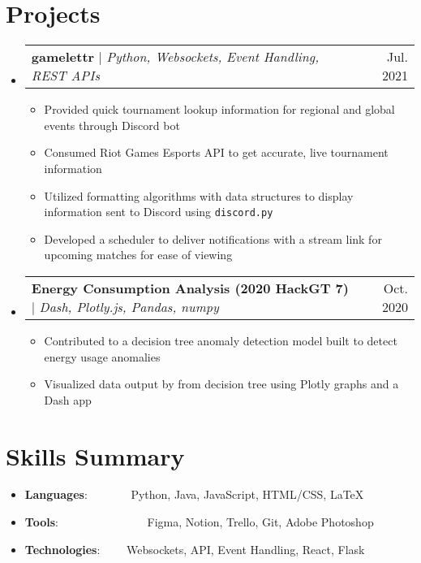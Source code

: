 \documentclass[a4paper,11pt]{extarticle}
\makeatletter
\newcommand{\resumeSkillItem}[2]{
	\item\small{
		\textbf{#1}{: #2 \vspace{-2pt}}
	}
}
\newcommand{\resumeItem}[1]{
	\item\small{
		#1 \vspace{-1pt}
	}
}
\newcommand{\resumeProjectHeading}[3]{
	\vspace{-3pt}\item
		\begin{tabular*}{1\linewidth}{l@{\extracolsep{\fill}}r}
			\textbf{#1} $|$ \emph{#2} & #3 \\
		\end{tabular*}\vspace{-3pt}
}
\newcommand{\resumeSubItem}[2]{\resumeSkillItem{#1}{#2}\vspace{-5pt}}
\newcommand{\resumeSubHeadingListStart}{\begin{itemize}[leftmargin=0.15in,label={}]}
\newcommand{\resumeSubHeadingListEnd}{\end{itemize}}
\newcommand{\resumeItemListStart}{\begin{itemize}\vspace{-3pt}}
\newcommand{\resumeItemListEnd}{\end{itemize}\vspace{-3pt}}
\makeatother
\begin{document}
\section{Projects}
    \resumeSubHeadingListStart
      \vspace{1mm}
      \resumeProjectHeading
          {gamelettr}
          {Python, Websockets, Event Handling, REST APIs}
          {Jul. 2021}
        \resumeItemListStart
            \resumeItem{Provided quick tournament lookup information for
                regional and global events through Discord bot}
            \resumeItem{Consumed Riot Games Esports API to get accurate, live
                tournament information}
            \resumeItem{Utilized formatting algorithms with data structures to
                display information sent to Discord using \texttt{discord.py}}
            \resumeItem{
                Developed a scheduler to deliver notifications with a stream link for upcoming matches for ease of viewing
            }
        \resumeItemListEnd
        \resumeProjectHeading
        {Energy Consumption Analysis (2020 HackGT 7)}
        {Dash, Plotly.js, Pandas, numpy}
        {Oct. 2020}
        \resumeItemListStart
            \resumeItem{
                Contributed to a decision tree anomaly detection model
                built to detect energy usage anomalies
            }
            \resumeItem{
                Visualized data output by from decision tree using Plotly
                graphs and a Dash app
            }
        \resumeItemListEnd
    \resumeSubHeadingListEnd

\section{Skills Summary}
	\resumeSubHeadingListStart
		\resumeSubItem{Languages}
			{\hspace{0.6mm}~~~~~~~Python, Java, JavaScript, HTML/CSS, \LaTeX}
		\resumeSubItem{Tools}
            {\hspace{0.3mm}~~~~~~~~~~~~~~~Figma, Notion, Trello, Git, Adobe
                Photoshop}
		\resumeSubItem{Technologies}
			{~~~~Websockets, API, Event Handling, React, Flask}
	\resumeSubHeadingListEnd
\end{document}
